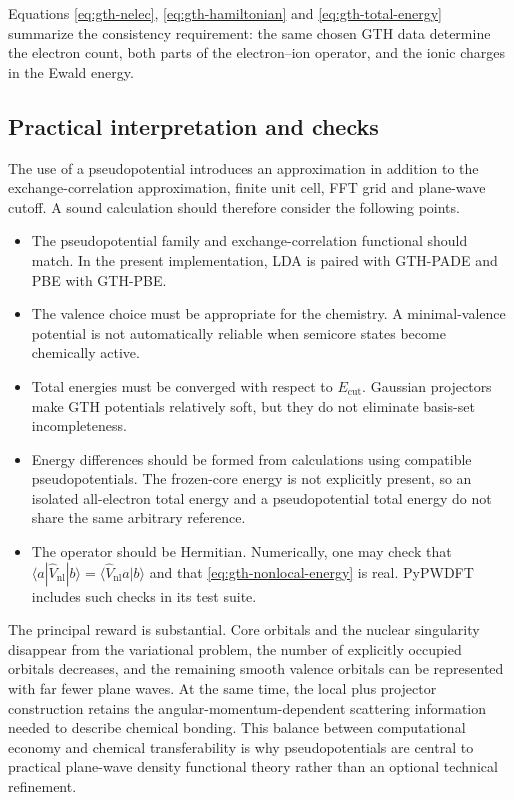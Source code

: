 Equations \eqref{eq:gth-nelec}, \eqref{eq:gth-hamiltonian} and \eqref{eq:gth-total-energy} summarize the consistency requirement: the same chosen GTH data determine the electron count, both parts of the electron--ion operator, and the ionic charges in the Ewald energy.

%
%
%
\subsection{Practical interpretation and checks}

The use of a pseudopotential introduces an approximation in addition to the exchange-correlation approximation, finite unit cell, FFT grid and plane-wave cutoff. A sound calculation should therefore consider the following points.

\begin{itemize}
    \item The pseudopotential family and exchange-correlation functional should match. In the present implementation, LDA is paired with GTH-PADE and PBE with GTH-PBE.
    \item The valence choice must be appropriate for the chemistry. A minimal-valence potential is not automatically reliable when semicore states become chemically active.
    \item Total energies must be converged with respect to $E_{\text{cut}}$. Gaussian projectors make GTH potentials relatively soft, but they do not eliminate basis-set incompleteness.
    \item Energy differences should be formed from calculations using compatible pseudopotentials. The frozen-core energy is not explicitly present, so an isolated all-electron total energy and a pseudopotential total energy do not share the same arbitrary reference.
    \item The operator should be Hermitian. Numerically, one may check that $\langle a|\hat{V}_{\text{nl}}|b\rangle=\langle\hat{V}_{\text{nl}}a|b\rangle$ and that \cref{eq:gth-nonlocal-energy} is real. PyPWDFT includes such checks in its test suite.
\end{itemize}

The principal reward is substantial. Core orbitals and the nuclear singularity disappear from the variational problem, the number of explicitly occupied orbitals decreases, and the remaining smooth valence orbitals can be represented with far fewer plane waves. At the same time, the local plus projector construction retains the angular-momentum-dependent scattering information needed to describe chemical bonding. This balance between computational economy and chemical transferability is why pseudopotentials are central to practical plane-wave density functional theory rather than an optional technical refinement.
